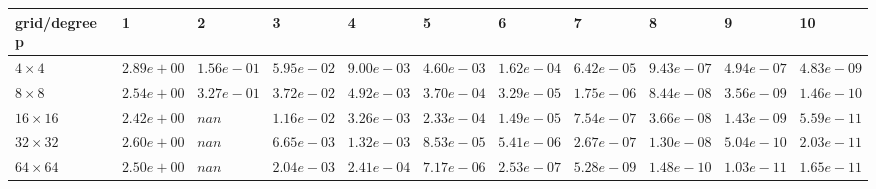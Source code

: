 \begin{tabular}{lllllllllll}
\hline
 grid/degree p   & 1          & 2          & 3          & 4          & 5          & 6          & 7          & 8          & 9          & 10         \\
\hline
 $4 \times 4$    & $2.89e+00$ & $1.56e-01$ & $5.95e-02$ & $9.00e-03$ & $4.60e-03$ & $1.62e-04$ & $6.42e-05$ & $9.43e-07$ & $4.94e-07$ & $4.83e-09$ \\
 $8 \times 8$    & $2.54e+00$ & $3.27e-01$ & $3.72e-02$ & $4.92e-03$ & $3.70e-04$ & $3.29e-05$ & $1.75e-06$ & $8.44e-08$ & $3.56e-09$ & $1.46e-10$ \\
 $16 \times 16$  & $2.42e+00$ & $nan$      & $1.16e-02$ & $3.26e-03$ & $2.33e-04$ & $1.49e-05$ & $7.54e-07$ & $3.66e-08$ & $1.43e-09$ & $5.59e-11$ \\
 $32 \times 32$  & $2.60e+00$ & $nan$      & $6.65e-03$ & $1.32e-03$ & $8.53e-05$ & $5.41e-06$ & $2.67e-07$ & $1.30e-08$ & $5.04e-10$ & $2.03e-11$ \\
 $64 \times 64$  & $2.50e+00$ & $nan$      & $2.04e-03$ & $2.41e-04$ & $7.17e-06$ & $2.53e-07$ & $5.28e-09$ & $1.48e-10$ & $1.03e-11$ & $1.65e-11$ \\
\hline
\end{tabular}